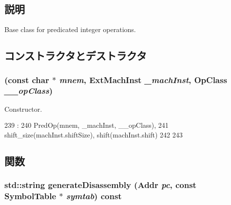 \subsection{説明}
Base class for predicated integer operations. 

\subsection{コンストラクタとデストラクタ}
\hypertarget{classArmISA_1_1PredIntOp_a5d6a0a4ebb8d55a8b0ee636f8642a9f6}{
\subsubsection[{PredIntOp}]{ (const char $\ast$ {\em mnem}, \/  {\bf ExtMachInst} {\em \_\-machInst}, \/  OpClass {\em \_\-\_\-opClass})}}
\label{classArmISA_1_1PredIntOp_a5d6a0a4ebb8d55a8b0ee636f8642a9f6}


Constructor. 


\begin{DoxyCode}
239                                                                           :
240               PredOp(mnem, _machInst, __opClass),
241               shift_size(machInst.shiftSize), shift(machInst.shift)
242     {
243     }

\end{DoxyCode}


\subsection{関数}
\hypertarget{classArmISA_1_1PredIntOp_a95d323a22a5f07e14d6b4c9385a91896}{
\subsubsection[{generateDisassembly}]{\setlength{\rightskip}{0pt plus 5cm}std::string generateDisassembly ({\bf Addr} {\em pc}, \/  const SymbolTable $\ast$ {\em symtab}) const}}
\label{classArmISA_1_1PredIntOp_a95d323a22a5f07e14d6b4c9385a91896}


